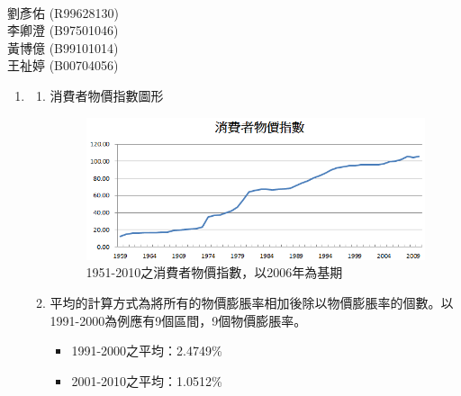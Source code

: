 \documentclass[12pt]{article}
\begin{document}
\begin{CJK}{UTF8}{cwmb}
\renewcommand{\figurename}{圖}

\voffset=-1cm
\textwidth=5.6in
\textheight=9.2in

\newenvironment{num}
 {\leftmargini=6mm\leftmarginii=8mm
  \begin{enumerate}\itemsep=-2pt}
 {\end{enumerate}}

\newenvironment{sol}
 {\begin{quote}\mbox{}\llap{\color{blue}{解答:}\rule{10mm}{0pt}}\hspace*{-4pt}}{\end{quote}}


\thispagestyle{empty}
\fontsize{12}{20pt}\selectfont
\begin{center}
{\large{}}\\[3mm]
劉彥佑 (R99628130)\\
李卿澄 (B97501046)\\
黃博億 (B99101014)\\
王祉婷 (B00704056)
\end{center}

\begin{num}
\item 
 \begin{num}
   \item 消費者物價指數圖形
\begin{figure}[htp]
\centering
\includegraphics[scale=0.78]{CPI.png}
\caption{1951-2010之消費者物價指數，以2006年為基期}
\label{}
\end{figure}
   \item 平均的計算方式為將所有的物價膨脹率相加後除以物價膨脹率的個數。以1991-2000為例應有9個區間，9個物價膨脹率。
   \begin{itemize}
   \item 1991-2000之平均：2.4749\%
   \item 2001-2010之平均：1.0512\%
   \end{itemize}


\end{num}
\end{num}
\end{CJK}
\end{document}
